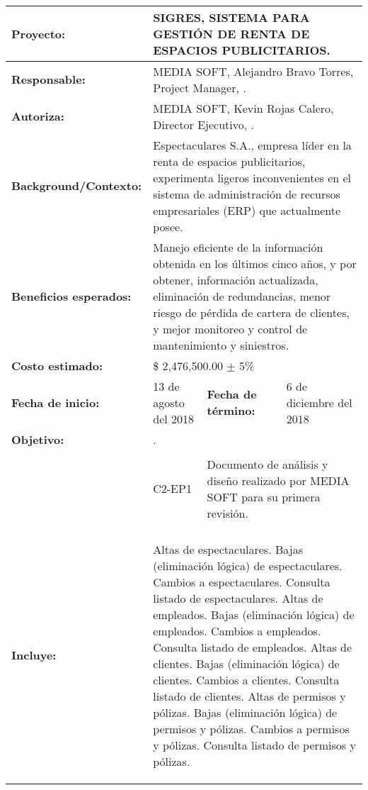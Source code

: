 

\newcommand{\ESCOMPchSec}[1]{\rowcolor{colorAgua}\multicolumn{4}{|c|}{\bf #1}\\\hline}
\newcommand{\ESCOMPchItem}[2]{{\bf {#1}} & \multicolumn{3}{p{.66\textwidth}|}{#2}\\\hline}
\newcommand{\ESCOMPchSubItem}[3]{{\bf {#1}} & {#2} & \multicolumn{2}{p{.44\textwidth}|}{#3}\\\hline}
\newcommand{\ESCOMPchSubSubItem}[4]{{\bf {#1}} & {#2} & {#3}& {#4}\\\hline}

\cleardoublepage
{\bigskip\\}
\begin{table}[hptb!] 
\begin{tabular}{|p{} |p{} |p{} |p{} |}
	\hline
	\ESCOMPchItem{Proyecto:}{SIGRES, SISTEMA PARA GESTIÓN DE RENTA DE ESPACIOS PUBLICITARIOS.}
	\ESCOMPchItem{Responsable:}{MEDIA SOFT, Alejandro Bravo Torres, Project Manager,  .}
	\ESCOMPchItem{Autoriza:}{MEDIA SOFT, Kevin Rojas Calero, Director Ejecutivo,   .}
	\ESCOMPchItem{Background/Contexto:}{Espectaculares S.A., empresa líder en la renta de espacios publicitarios, experimenta ligeros inconvenientes en el sistema de administración de recursos empresariales (ERP) que actualmente posee.}
	\ESCOMPchItem{Beneficios esperados:}{Manejo eficiente de la información obtenida en los últimos cinco años, y por obtener, información actualizada, eliminación de redundancias, menor riesgo de pérdida de cartera de clientes, y mejor monitoreo y control de mantenimiento y siniestros.}
	\ESCOMPchItem{Costo estimado:}{\$ 2,476,500.00 $\pm$ 5\%}
	\ESCOMPchSubSubItem{Fecha de inicio:}{13 de agosto del 2018}{\bf Fecha de término:}{6 de diciembre del 2018}
	\ESCOMPchItem{Objetivo:}{.}
	\ESCOMPchSec{Entregables Principales}
	\ESCOMPchSubItem{}{C2-EP1 }{Documento de análisis y diseño realizado por MEDIA SOFT para su primera revisión.}
	\ESCOMPchSec{Alcance del proyecto}
	\ESCOMPchItem{Incluye:}{
		\begin{Titemize}
			\Titem Altas de espectaculares.
			\Titem Bajas (eliminación lógica) de espectaculares.
			\Titem Cambios a espectaculares.
			\Titem Consulta listado de espectaculares.
			\Titem Altas de empleados.
			\Titem Bajas (eliminación lógica) de empleados.
			\Titem Cambios a empleados.
			\Titem Consulta listado de empleados.
			\Titem Altas de clientes.
			\Titem Bajas (eliminación lógica) de clientes.
			\Titem Cambios a clientes.
			\Titem Consulta listado de clientes.
			\Titem Altas de permisos y pólizas.
			\Titem Bajas (eliminación lógica) de permisos y pólizas.
			\Titem Cambios a permisos y pólizas.
			\Titem Consulta listado de permisos y pólizas.
		\end{Titemize}
	}
	\end{tabular}
	\label{tbl:projectCharter}
\end{table}

